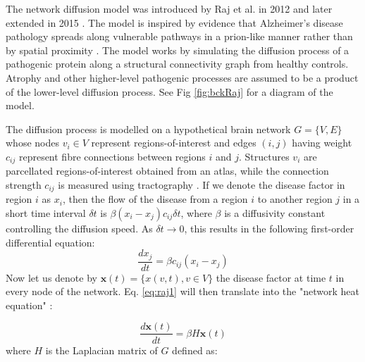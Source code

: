 The network diffusion model was introduced by Raj et al. in 2012 \cite{raj2012network} and later extended in 2015 \cite{raj2015network}. The model is inspired by evidence that Alzheimer's disease pathology spreads along vulnerable pathways in a prion-like manner rather than by spatial proximity \cite{villain2010sequential, englund1988white, kuczynski2010white}. The model works by simulating the diffusion process of a pathogenic protein along a structural connectivity graph from healthy controls. Atrophy and other higher-level pathogenic processes are assumed to be a product of the lower-level diffusion process. See Fig \ref{fig:bckRaj} for a diagram of the model.

The diffusion process is modelled on a hypothetical brain network $G = \{V, E\}$ whose nodes $v_i \in V$ represent regions-of-interest and edges $(i,j)$ having weight $c_{ij}$ represent fibre connections between regions $i$ and $j$. Structures $v_i$ are parcellated regions-of-interest obtained from an atlas, while the connection strength $c_{ij}$ is measured using tractography \cite{behrens2007probabilistic}. If we denote the disease factor in region $i$ as $x_i$, then the flow of the disease from a region $i$ to another region $j$ in a short time interval $\delta t$ is $\beta(x_i - x_j)c_{ij}\delta t$, where $\beta$ is a diffusivity constant controlling the diffusion speed. As $\delta t \to 0$, this results in the following first-order differential equation:
\begin{equation}
\label{eq:raj1}
 \frac{dx_j}{dt} = \beta c_{ij}(x_i - x_j)
\end{equation}
Now let us denote by $\textbf{x}(t) = \{x(v,t), v \in V \}$ the disease factor at time $t$ in every node of the network. Eq. \ref{eq:raj1} will then translate into the "network heat equation" \cite{kondor2002diffusion}:

\begin{equation}
\label{eq:raj2}
 \frac{d\textbf{x}(t)}{dt} = \beta H \textbf{x}(t)
\end{equation}
where $H$ is the Laplacian matrix of $G$ defined as:

